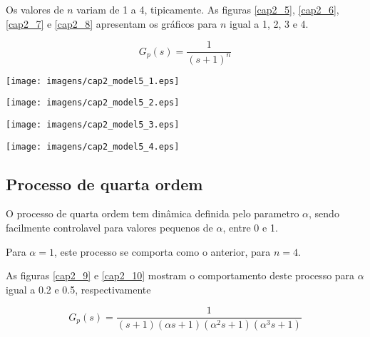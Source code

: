     Os valores de $n$ variam de 1 a 4, tipicamente. As figuras \ref{cap2_5},
    \ref{cap2_6}, \ref{cap2_7} e \ref{cap2_8} apresentam os gráficos para
    $n$ igual a 1, 2, 3 e 4.
    
    \begin{equation}
        G_p(s) = \frac{1}{(s+1)^n}
    \end{equation}

    \begin{center}
        \texttt{[image: imagens/cap2\_model5\_1.eps]}
        \label{cap2_5}
    \end{center}
    
    \begin{center}
        \texttt{[image: imagens/cap2\_model5\_2.eps]}
        \label{cap2_6}
    \end{center}
    
    \begin{center}
        \texttt{[image: imagens/cap2\_model5\_3.eps]}
        \label{cap2_7}
    \end{center}
    
    \begin{center}
        \texttt{[image: imagens/cap2\_model5\_4.eps]}
        \label{cap2_8}
    \end{center}

\subsection{Processo de quarta ordem}
    
    O processo de quarta ordem tem dinâmica definida pelo parametro $\alpha$,
    sendo facilmente controlavel para valores pequenos de $\alpha$, entre 0 e 1.
    
    Para $\alpha = 1$, este processo se comporta como o anterior, para $n = 4$.
    
    As figuras \ref{cap2_9} e \ref{cap2_10} mostram o comportamento deste
    processo para $\alpha$ igual a 0.2 e 0.5, respectivamente
    
    \begin{equation}
        G_p(s) = \frac{1}{(s+1)(\alpha s+1)(\alpha ^2 s+1)(\alpha ^3 s+1)}
    \end{equation}

